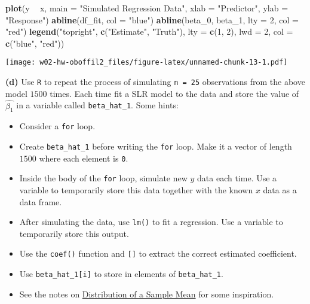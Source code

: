 \documentclass[]{article}
\newenvironment{Shaded}{\begin{snugshade}}{\end{snugshade}}
\newcommand{\DataTypeTok}[1]{\textcolor[rgb]{0.13,0.29,0.53}{#1}}
\newcommand{\DecValTok}[1]{\textcolor[rgb]{0.00,0.00,0.81}{#1}}
\newcommand{\KeywordTok}[1]{\textcolor[rgb]{0.13,0.29,0.53}{\textbf{#1}}}
\newcommand{\NormalTok}[1]{#1}
\newcommand{\OperatorTok}[1]{\textcolor[rgb]{0.81,0.36,0.00}{\textbf{#1}}}
\newcommand{\StringTok}[1]{\textcolor[rgb]{0.31,0.60,0.02}{#1}}
\providecommand{\tightlist}{%
  \setlength{\itemsep}{0pt}\setlength{\parskip}{0pt}}
\begin{document}
\begin{Shaded}
\begin{Highlighting}[]
\KeywordTok{plot}\NormalTok{(y }\OperatorTok{~}\StringTok{ }\NormalTok{x, }\DataTypeTok{main =} \StringTok{"Simulated Regression Data"}\NormalTok{,}
     \DataTypeTok{xlab =} \StringTok{"Predictor"}\NormalTok{,}
     \DataTypeTok{ylab =} \StringTok{"Response"}\NormalTok{)}
\KeywordTok{abline}\NormalTok{(df_fit, }\DataTypeTok{col =} \StringTok{"blue"}\NormalTok{)}
\KeywordTok{abline}\NormalTok{(beta_}\DecValTok{0}\NormalTok{, beta_}\DecValTok{1}\NormalTok{, }\DataTypeTok{lty =} \DecValTok{2}\NormalTok{, }\DataTypeTok{col =} \StringTok{"red"}\NormalTok{)}
\KeywordTok{legend}\NormalTok{(}\StringTok{"topright"}\NormalTok{, }\KeywordTok{c}\NormalTok{(}\StringTok{"Estimate"}\NormalTok{, }\StringTok{"Truth"}\NormalTok{), }\DataTypeTok{lty =} \KeywordTok{c}\NormalTok{(}\DecValTok{1}\NormalTok{, }\DecValTok{2}\NormalTok{), }\DataTypeTok{lwd =} \DecValTok{2}\NormalTok{, }\DataTypeTok{col =} \KeywordTok{c}\NormalTok{(}\StringTok{"blue"}\NormalTok{, }\StringTok{"red"}\NormalTok{))}
\end{Highlighting}
\end{Shaded}

\texttt{[image: w02-hw-oboffil2\_files/figure-latex/unnamed-chunk-13-1.pdf]}

\textbf{(d)} Use \texttt{R} to repeat the process of simulating
\texttt{n\ =\ 25} observations from the above model \(1500\) times. Each
time fit a SLR model to the data and store the value of
\(\hat{\beta_1}\) in a variable called \texttt{beta\_hat\_1}. Some
hints:

\begin{itemize}
\tightlist
\item
  Consider a \texttt{for} loop.
\item
  Create \texttt{beta\_hat\_1} before writing the \texttt{for} loop.
  Make it a vector of length \(1500\) where each element is \texttt{0}.
\item
  Inside the body of the \texttt{for} loop, simulate new \(y\) data each
  time. Use a variable to temporarily store this data together with the
  known \(x\) data as a data frame.
\item
  After simulating the data, use \texttt{lm()} to fit a regression. Use
  a variable to temporarily store this output.
\item
  Use the \texttt{coef()} function and \texttt{{[}{]}} to extract the
  correct estimated coefficient.
\item
  Use \texttt{beta\_hat\_1{[}i{]}} to store in elements of
  \texttt{beta\_hat\_1}.
\item
  See the notes on
  \href{http://daviddalpiaz.github.io/appliedstats/introduction-to-r.html\#distribution-of-a-sample-mean}{Distribution
  of a Sample Mean} for some inspiration.
\end{itemize}
\end{document}
